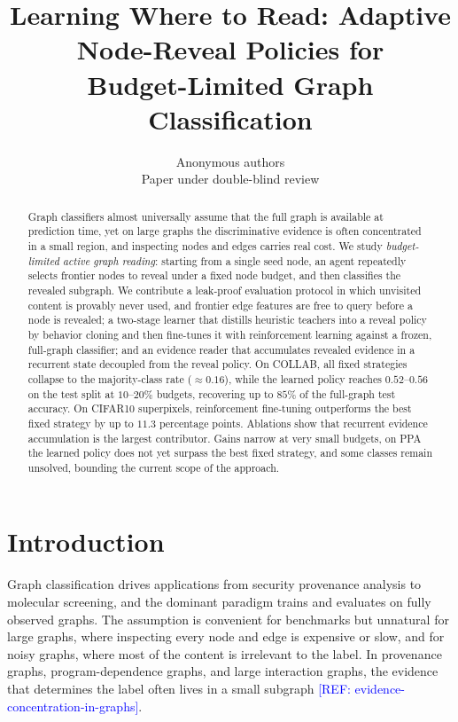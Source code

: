 \documentclass{article}
\title{Learning Where to Read: Adaptive Node-Reveal Policies for\\ Budget-Limited Graph Classification}
\author{Anonymous authors\\ Paper under double-blind review}
\newcommand{\refadd}[1]{\textcolor{blue}{[REF: #1]}}
\begin{document}
\maketitle

\begin{abstract}
Graph classifiers almost universally assume that the full graph is available at prediction time, yet on large graphs the discriminative evidence is often concentrated in a small region, and inspecting nodes and edges carries real cost. We study \emph{budget-limited active graph reading}: starting from a single seed node, an agent repeatedly selects frontier nodes to reveal under a fixed node budget, and then classifies the revealed subgraph. We contribute a leak-proof evaluation protocol in which unvisited content is provably never used, and frontier edge features are free to query before a node is revealed; a two-stage learner that distills heuristic teachers into a reveal policy by behavior cloning and then fine-tunes it with reinforcement learning against a frozen, full-graph classifier; and an evidence reader that accumulates revealed evidence in a recurrent state decoupled from the reveal policy. On COLLAB, all fixed strategies collapse to the majority-class rate ($\approx 0.16$), while the learned policy reaches $0.52$--$0.56$ on the test split at $10$--$20\%$ budgets, recovering up to $85\%$ of the full-graph test accuracy. On CIFAR10 superpixels, reinforcement fine-tuning outperforms the best fixed strategy by up to $11.3$ percentage points. Ablations show that recurrent evidence accumulation is the largest contributor. Gains narrow at very small budgets, on PPA the learned policy does not yet surpass the best fixed strategy, and some classes remain unsolved, bounding the current scope of the approach.
\end{abstract}

\section{Introduction}
\label{sec:intro}

Graph classification drives applications from security provenance analysis to molecular screening, and the dominant paradigm trains and evaluates on fully observed graphs. The assumption is convenient for benchmarks but unnatural for large graphs, where inspecting every node and edge is expensive or slow, and for noisy graphs, where most of the content is irrelevant to the label. In provenance graphs, program-dependence graphs, and large interaction graphs, the evidence that determines the label often lives in a small subgraph \refadd{evidence-concentration-in-graphs}.
\end{document}
